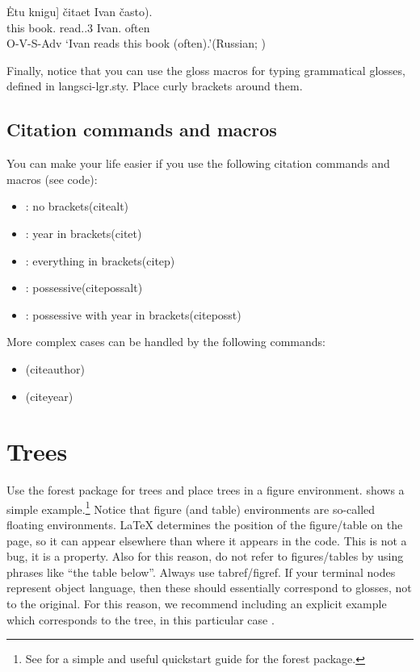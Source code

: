 \ea\label{sim:ex:bailyn}\gll \minsp{[} Ėtu knigu] čitaet Ivan \minsp{(} často).\\
{} this book.{\ACC} read.{\PRS.3\SG} Ivan.{\NOM} {} often\\\hfill O-V-S-Adv
\glt `Ivan reads this book (often).'\hfill (Russian; \citealt[4]{Bailyn2004})
\z

\noindent Finally, notice that you can use the gloss macros for typing grammatical glosses, defined in langsci-lgr.sty. Place curly brackets around them.

\subsection{Citation commands and macros}

You can make your life easier if you use the following citation commands and macros (see code):

\begin{itemize}
    \item \citealt{Bailyn2004}: no brackets\hfill (citealt)
    \item \citet{Bailyn2004}: year in brackets\hfill (citet)
    \item \citep{Bailyn2004}: everything in brackets\hfill (citep)
    \item {}: possessive\hfill (citepossalt)
    \item {}: possessive with year in brackets\hfill (citeposst)
\end{itemize}

\noindent More complex cases can be handled by the following commands:

\begin{itemize}
    \item \citeauthor{Bailyn2004}\hfill (citeauthor)
    \item \citeyear{Bailyn2004}\hfill (citeyear)
\end{itemize}

\section{Trees}\label{s:tree}

Use the forest package for trees and place trees in a figure environment.  shows a simple example.\footnote{See \citet{VandenWyngaerd2020} for a simple and useful quickstart guide for the forest package.} Notice that figure (and table) environments are so-called floating environments. {\LaTeX} determines the position of the figure/table on the page, so it can appear elsewhere than where it appears in the code. This is not a bug, it is a property. Also for this reason, do not refer to figures/tables by using phrases like ``the table below''. Always use tabref/figref. If your terminal nodes represent object language, then these should essentially correspond to glosses, not to the original. For this reason, we recommend including an explicit example which corresponds to the tree, in this particular case .

